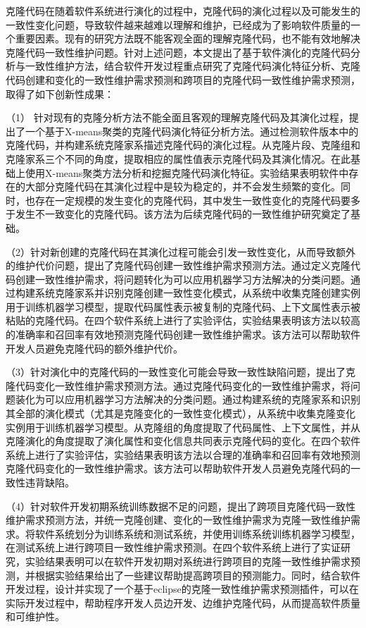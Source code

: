 

克隆代码在随着软件系统进行演化的过程中，克隆代码的演化过程以及可能发生的一致性变化问题，导致软件越来越难以理解和维护，已经成为了影响软件质量的一个重要因素。现有的研究方法既不能客观全面的理解克隆代码，也不能有效地解决克隆代码一致性维护问题。针对上述问题，本文提出了基于软件演化的克隆代码分析与一致性维护方法，结合软件开发过程重点研究了克隆代码演化特征分析、克隆代码创建和变化的一致性维护需求预测和跨项目的克隆代码一致性维护需求预测，取得了如下创新性成果：

（1） 针对现有的克隆分析方法不能全面且客观的理解克隆代码及其演化过程，提出了一个基于X-means聚类的克隆代码演化特征分析方法。通过检测软件版本中的克隆代码，并构建系统克隆家系描述克隆代码的演化过程。从克隆片段、克隆组和克隆家系三个不同的角度，提取相应的属性值表示克隆代码及其演化情况。在此基础上使用X-means聚类方法分析和挖掘克隆代码演化特征。实验结果表明软件中存在的大部分克隆代码在其演化过程中是较为稳定的，并不会发生频繁的变化。同时，也存在一定规模的发生变化的克隆代码，其中发生一致性变化的克隆代码要多于发生不一致变化的克隆代码。该方法为后续克隆代码的一致性维护研究奠定了基础。

（2）针对新创建的克隆代码在其演化过程可能会引发一致性变化，从而导致额外的维护代价问题，提出了克隆代码创建一致性维护需求预测方法。通过定义克隆代码创建一致性维护需求，将问题转化为可以应用机器学习方法解决的分类问题。通过构建系统克隆家系并识别克隆创建一致性变化模式，从系统中收集克隆创建实例用于训练机器学习模型，提取代码属性表示被复制的克隆代码、上下文属性表示被粘贴的克隆代码。在四个软件系统上进行了实验评估，实验结果表明该方法以较高的准确率和召回率有效地预测克隆代码创建一致性维护需求。该方法可以帮助软件开发人员避免克隆代码的额外维护代价。

（3）针对演化中的克隆代码的一致性变化可能会导致一致性缺陷问题，提出了克隆代码变化一致性维护需求预测方法。通过克隆代码变化的一致性维护需求，将问题装化为可以应用机器学习方法解决的分类问题。通过构建系统的克隆家系和识别其全部的演化模式（尤其是克隆变化的一致性变化模式），从系统中收集克隆变化实例用于训练机器学习模型。从克隆组的角度提取了代码属性、上下文属性，并从克隆演化的角度提取了演化属性和变化信息共同表示克隆代码的变化。在四个软件系统上进行了实验评估，实验结果表明该方法以合理的准确率和召回率有效地预测克隆代码变化的一致性维护需求。该方法可以帮助软件开发人员避免克隆代码的一致性违背缺陷。

（4）针对软件开发初期系统训练数据不足的问题，提出了跨项目克隆代码一致性维护需求预测方法，并统一克隆创建、变化的一致性维护需求为克隆一致性维护需求。将软件系统划分为训练系统和测试系统，并使用训练系统训练机器学习模型，在测试系统上进行跨项目一致性维护需求预测。在四个软件系统上进行了实证研究，实验结果表明可以在软件开发初期对系统进行跨项目的克隆一致性维护需求预测，并根据实验结果给出了一些建议帮助提高跨项目的预测能力。同时，结合软件开发过程，设计并实现了一个基于eclipse的克隆一致性维护需求预测插件，可以在实际开发过程中，帮助程序开发人员边开发、边维护克隆代码，从而提高软件质量和可维护性。

